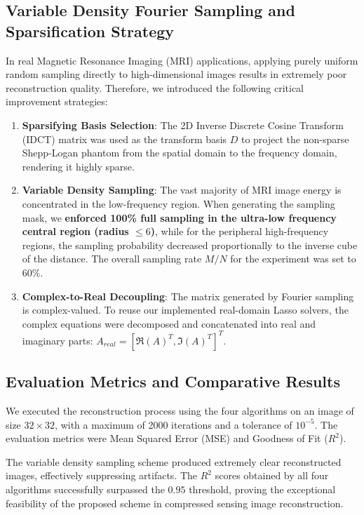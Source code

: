 \documentclass[12pt, a4paper]{article}
\begin{document}
\subsection{Variable Density Fourier Sampling and Sparsification Strategy}
In real Magnetic Resonance Imaging (MRI) applications, applying purely uniform random sampling directly to high-dimensional images results in extremely poor reconstruction quality. Therefore, we introduced the following critical improvement strategies:
\begin{enumerate}
    \item \textbf{Sparsifying Basis Selection}: The 2D Inverse Discrete Cosine Transform (IDCT) matrix was used as the transform basis $D$ to project the non-sparse Shepp-Logan phantom from the spatial domain to the frequency domain, rendering it highly sparse.
    \item \textbf{Variable Density Sampling}: The vast majority of MRI image energy is concentrated in the low-frequency region. When generating the sampling mask, we \textbf{enforced 100\% full sampling in the ultra-low frequency central region (radius $\le 6$)}, while for the peripheral high-frequency regions, the sampling probability decreased proportionally to the inverse cube of the distance. The overall sampling rate $M/N$ for the experiment was set to $60\%$.
    \item \textbf{Complex-to-Real Decoupling}: The matrix generated by Fourier sampling is complex-valued. To reuse our implemented real-domain Lasso solvers, the complex equations were decomposed and concatenated into real and imaginary parts: $A_{real} = [\Re(A)^T, \Im(A)^T]^T$.
\end{enumerate}

\subsection{Evaluation Metrics and Comparative Results}
We executed the reconstruction process using the four algorithms on an image of size $32 \times 32$, with a maximum of 2000 iterations and a tolerance of $10^{-5}$. The evaluation metrics were Mean Squared Error (MSE) and Goodness of Fit ($R^2$).

The variable density sampling scheme produced extremely clear reconstructed images, effectively suppressing artifacts. The $R^2$ scores obtained by all four algorithms successfully surpassed the $0.95$ threshold, proving the exceptional feasibility of the proposed scheme in compressed sensing image reconstruction.
\end{document}
